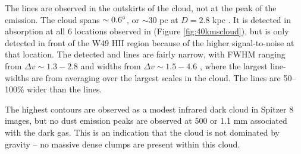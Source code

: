 The \formaldehyde lines are observed in the outskirts of the cloud, not at
the peak of the \thirteenco emission.  The cloud spans $\sim0.6^{\circ}$, or
$\sim30$ pc at $D=2.8$ kpc \citep{Roman-Duval2009a}.  It is detected in \oneone
absorption at all 6 locations observed in \formaldehyde (Figure
\ref{fig:40kmscloud}), but \twotwo is only detected in front of the W49 HII
region because of the higher signal-to-noise at that location.  The detected
\thirteenco and \formaldehyde lines are fairly narrow, with \formaldehyde FWHM
ranging from $\Delta v \sim1.3-2.8$ \kms and \thirteenco widths from $\Delta v
\sim1.5-4.6$ \kms, where the largest line-widths are from averaging over the
largest scales in the cloud.  The \thirteenco lines are 50--100\% wider than the
\formaldehyde lines.

The highest \thirteenco contours are observed as a modest infrared dark cloud
in Spitzer 8 \um images, but no dust emission peaks are observed at 500 \um
\citep[Herschel;][]{Traficante2011a} or 1.1 mm
\citep[Bolocam;][]{Aguirre2011a,Ginsburg2013b} associated with the dark gas.
This is an indication that the cloud is not dominated by gravity -- no
massive dense clumps are present within this cloud.


